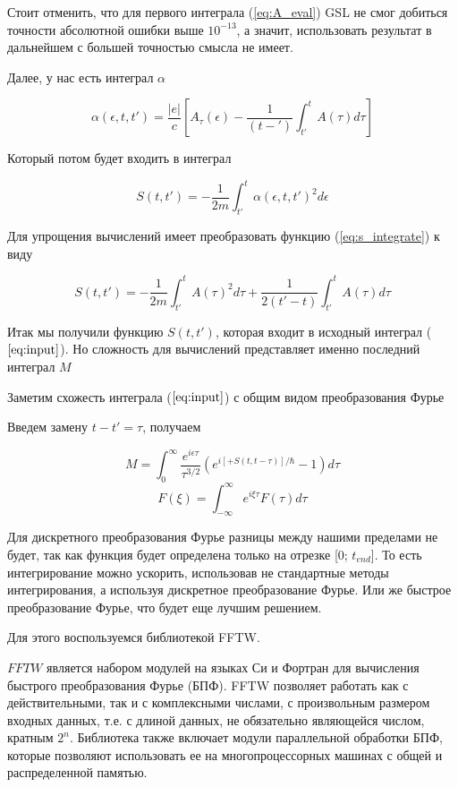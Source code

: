 \documentclass[14pt]{extarticle}
\begin{document}
Стоит отменить, что для первого интеграла (\ref{eq:A_eval}) GSL не смог добиться точности абсолютной ошибки выше $10^{-13}$, а значит, использовать результат в дальнейшем с большей точностью смысла не имеет.

Далее, у нас есть интеграл $\alpha$

\begin{equation}\label{eq:alpha}
	\alpha(\epsilon, t, t') = \frac{|e|}{c} [A_{\tau}(\epsilon) - \frac{1}{(t-')}\int_{t'}^{t}A(\tau) d\tau]
\end{equation}

Который потом будет входить в интеграл 

\begin{equation}\label{eq:s_integrate}
	S(t, t') = -\frac{1}{2m}\int_{t'}^{t} \alpha(\epsilon, t, t')^2 d\epsilon
\end{equation}

Для упрощения вычислений имеет преобразовать функцию (\ref{eq:s_integrate}) к виду

\begin{equation}\label{eq:s_integrate2}
S(t, t') = -\frac{1}{2m}\int_{t'}^{t} A(\tau)^2 d\tau + \frac{1}{2(t'-t)} \int_{t'}^{t}A(\tau) d\tau
\end{equation}

Итак мы получили функцию $S(t, t')$, которая входит в исходный интеграл ($\ref{eq:input}$). Но сложность для вычислений представляет именно последний интеграл $M$

Заметим схожесть интеграла ($\ref{eq:input}$) с общим видом преобразования Фурье

Введем замену $t - t' = \tau$, получаем

$$
M = \int_{0}^{\infty}\frac{e^{i\epsilon \tau}}{{\tau}^{3/2}}(e^{i [+ S(t, t-\tau)]/\hbar} - 1) d\tau 
$$
$$
F(\xi) = \int_{-\infty}^{\infty}e^{i\xi \tau} F(\tau) d\tau 
$$

Для дискретного преобразования Фурье разницы между нашими пределами не будет, так как функция будет определена только на отрезке [0; $t_{end}$].
То есть интегрирование можно ускорить, использовав не стандартные методы интегрирования, а используя дискретное преобразование Фурье. Или же быстрое преобразование Фурье, что будет еще лучшим решением.

Для этого воспользуемся библиотекой FFTW.

$FFTW$ является набором модулей на языках Си и Фортран для вычисления быстрого преобразования Фурье (БПФ). FFTW позволяет работать как с действительными, так и с комплексными числами, с произвольным размером входных данных, т.е. с длиной данных, не обязательно являющейся числом, кратным $2^n$. Библиотека также включает модули параллельной обработки БПФ, которые позволяют использовать ее на многопроцессорных машинах с общей и распределенной памятью.
\end{document}
